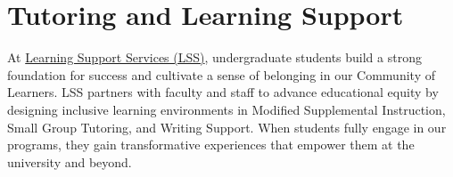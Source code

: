 \documentclass[12pt]{article}
\begin{document}
\section{Tutoring and Learning Support}
At \href{https://lss.ucsc.edu/}{Learning Support Services (LSS)}, undergraduate students build a strong foundation for success and cultivate a sense of belonging in our Community of Learners. LSS partners with faculty and staff to advance educational equity by designing inclusive learning environments in Modified Supplemental Instruction, Small Group Tutoring, and Writing Support. When students fully engage in our programs, they gain transformative experiences that empower them at the university and beyond.
\end{document}
